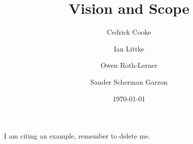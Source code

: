 \documentclass[12pt, letterpaper]{article}
\title{Vision and Scope}
\author{ Cedrick Cooke
    \and Ian Littke
    \and Owen Roth-Lerner
    \and Sander Scherman Garzon
}
\date{\today}
\begin{document}
\maketitle

I am citing an example, remember to delete me\cite{example}.

{}

\end{document}
